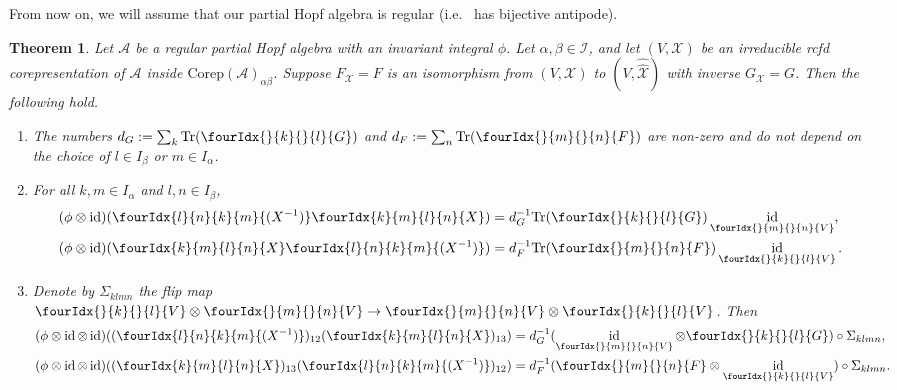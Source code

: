 \documentclass[10pt]{article}
\DeclareMathOperator{\id}{id}
\newcommand{\Corep}{\mathrm{Corep}}
\newcommand{\Tr}{\mathrm{Tr}}
\newcommand{\Gr}[5]{\fourIdx{#2}{#4}{#3}{#5}{#1}}%
\newcommand{\Gru}[3]{\Gr{#1}{}{}{#2}{#3}}
\newtheorem{Theorem}{Theorem}[section]
\theoremstyle{definition}
\numberwithin{equation}{section}
\begin{document}
From now on, we will assume that our partial Hopf algebra is regular (i.e.~ has bijective antipode).

\begin{Theorem} \label{thm:rep-orthogonality} Let $\mathscr{A}$ be a
  regular partial Hopf algebra with an invariant integral $\phi$. Let $\alpha,\beta\in \mathscr{I}$, and let $(V,\mathscr{X})$
  be an irreducible rcfd corepresentation of $\mathscr{A}$ inside $\Corep(\mathscr{A})_{\alpha\beta}$. Suppose
  $F_{\mathscr{X}}=F$ is an isomorphism from $(V,\mathscr{X})$ to
  $(V,\hat{\hat{\mathscr{X}}})$ with inverse
  $G_{\mathscr{X}}= G$. Then the following hold.
  \begin{enumerate}[label=(\arabic*)]
  \item The numbers $d_G:=\sum_{k} \Tr (\Gru{G}{k}{l})$ and $d_F:=\sum_{n} \Tr (\Gru{F}{m}{n})$ are non-zero and do not depend on the choice of $l \in I_\beta$ or $m\in I_\alpha$.
    \item  For all $k,m \in I_\alpha$ and $l,n\in I_\beta$,
    \begin{align*}
      (\phi \otimes \id)(\Gr{(X^{-1})}{l}{k}{n}{m}\Gr{X}{k}{l}{m}{n})
      &=d_G^{-1}\Tr(\Gru{G}{k}{l})
      \id_{\Gru{V}{m}{n}}, \\
      (\phi \otimes \id)(\Gr{X}{k}{l}{m}{n}\Gr{(X^{-1})}{l}{k}{n}{m})
      &=d_F^{-1}\Tr(\Gru{F}{m}{n})
      \id_{\Gru{V}{k}{l}}.
    \end{align*}
  \item Denote by $\Sigma_{klmn}$ the flip map $\Gru{V}{k}{l}
    \otimes \Gru{V}{m}{n} \to \Gru{V}{m}{n}
    \otimes \Gru{V}{k}{l}$. Then
 \begin{align*}
   (\phi \otimes \id \otimes
   \id)((\Gr{(X^{-1})}{l}{k}{n}{m})_{12}(\Gr{X}{k}{l}{m}{n})_{13}) &=
   d_G^{-1}
   (\id_{\Gru{V}{m}{n}} \otimes \Gru{G}{k}{l})
   \circ \Sigma_{klmn}, \\
   (\phi \otimes \id \otimes
   \id)((\Gr{X}{k}{l}{m}{n})_{13}(\Gr{(X^{-1})}{l}{k}{n}{m})_{12}) &= d_F^{-1} (\Gru{F}{m}{n}
   \otimes \id_{\Gru{V}{k}{l}}) \circ \Sigma_{klmn}.
 \end{align*}
\end{enumerate}
  \end{Theorem}
\end{document}
